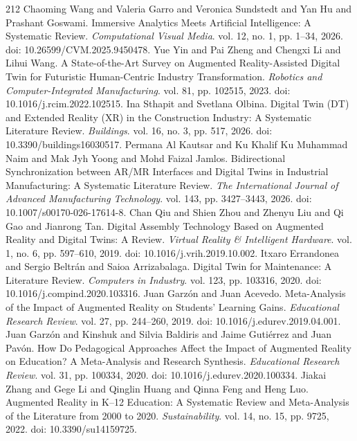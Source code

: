 \begin{thebibliography}{212}
 Chaoming Wang and Valeria Garro and Veronica Sundstedt and Yan Hu and Prashant Goswami. Immersive Analytics Meets Artificial Intelligence: A Systematic Review. \emph{Computational Visual Media}. vol. 12, no. 1, pp. 1--34, 2026. doi: 10.26599/CVM.2025.9450478.
 Yue Yin and Pai Zheng and Chengxi Li and Lihui Wang. A State-of-the-Art Survey on Augmented Reality-Assisted Digital Twin for Futuristic Human-Centric Industry Transformation. \emph{Robotics and Computer-Integrated Manufacturing}. vol. 81, pp. 102515, 2023. doi: 10.1016/j.rcim.2022.102515.
 Ina Sthapit and Svetlana Olbina. Digital Twin ({DT}) and Extended Reality ({XR}) in the Construction Industry: A Systematic Literature Review. \emph{Buildings}. vol. 16, no. 3, pp. 517, 2026. doi: 10.3390/buildings16030517.
 Permana Al Kautsar and Ku Khalif Ku Muhammad Naim and Mak Jyh Yoong and Mohd Faizal Jamlos. Bidirectional Synchronization between {AR/MR} Interfaces and Digital Twins in Industrial Manufacturing: A Systematic Literature Review. \emph{The International Journal of Advanced Manufacturing Technology}. vol. 143, pp. 3427--3443, 2026. doi: 10.1007/s00170-026-17614-8.
 Chan Qiu and Shien Zhou and Zhenyu Liu and Qi Gao and Jianrong Tan. Digital Assembly Technology Based on Augmented Reality and Digital Twins: A Review. \emph{Virtual Reality \& Intelligent Hardware}. vol. 1, no. 6, pp. 597--610, 2019. doi: 10.1016/j.vrih.2019.10.002.
 Itxaro Errandonea and Sergio Beltr{\'a}n and Saioa Arrizabalaga. Digital Twin for Maintenance: A Literature Review. \emph{Computers in Industry}. vol. 123, pp. 103316, 2020. doi: 10.1016/j.compind.2020.103316.
 Juan Garz{\'o}n and Juan Acevedo. Meta-Analysis of the Impact of Augmented Reality on Students' Learning Gains. \emph{Educational Research Review}. vol. 27, pp. 244--260, 2019. doi: 10.1016/j.edurev.2019.04.001.
 Juan Garz{\'o}n and Kinshuk and Silvia Baldiris and Jaime Guti{\'e}rrez and Juan Pav{\'o}n. How Do Pedagogical Approaches Affect the Impact of Augmented Reality on Education? A Meta-Analysis and Research Synthesis. \emph{Educational Research Review}. vol. 31, pp. 100334, 2020. doi: 10.1016/j.edurev.2020.100334.
 Jiakai Zhang and Gege Li and Qinglin Huang and Qinna Feng and Heng Luo. Augmented Reality in {K--12} Education: A Systematic Review and Meta-Analysis of the Literature from 2000 to 2020. \emph{Sustainability}. vol. 14, no. 15, pp. 9725, 2022. doi: 10.3390/su14159725.

\end{thebibliography}
